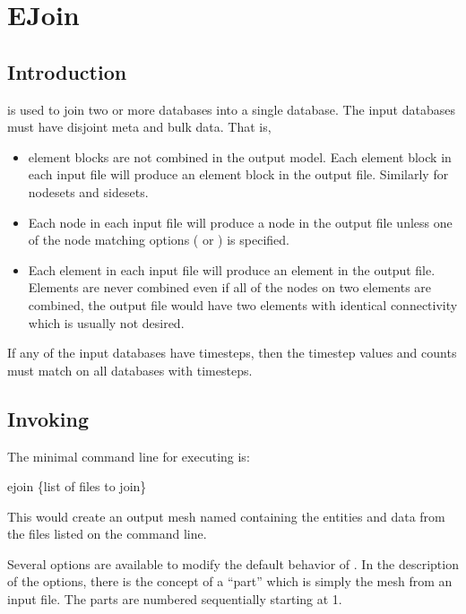 \chapter{EJoin}\label{ch:ejoin}
\section{Introduction}
\ejoin{} is used to join two or more \exo{} databases into a single
\exo{} database. The input databases must have disjoint meta and bulk data.
That is,
\begin{itemize}
\item element blocks are not combined in the output model.  Each
element block in each input file will produce an element block in the
output file. Similarly for nodesets and sidesets.
\item Each node in each input file will produce a node in the output
file unless one of the node matching options
( or ) is specified.
\item Each element in each input file will produce an element in the
output file. Elements are never combined even if all of the nodes on
two elements are combined, the output file would have two elements
with identical connectivity which is usually not desired.
\end{itemize}
If any of the input databases have timesteps, then the timestep values
and counts must match on all databases with timesteps.

\section{Invoking \ejoin}

The minimal command line for executing \ejoin{} is:
\begin{syntax}
     ejoin \{list of files to join\}
\end{syntax}
This would create an output mesh named  containing
the entities and data from the files listed on the command line.

Several options are available to modify the default behavior of
\ejoin{}. In the description of the options, there is the concept of a
``part'' which is simply the mesh from an input file. The parts are
numbered sequentially starting at 1.

